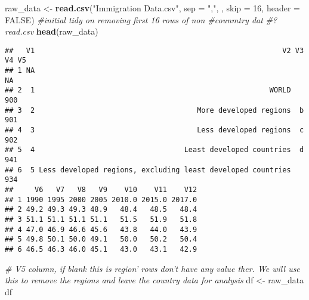 \documentclass[]{article}
\newenvironment{Shaded}{\begin{snugshade}}{\end{snugshade}}
\newcommand{\CommentTok}[1]{\textcolor[rgb]{0.56,0.35,0.01}{\textit{#1}}}
\newcommand{\DataTypeTok}[1]{\textcolor[rgb]{0.13,0.29,0.53}{#1}}
\newcommand{\DecValTok}[1]{\textcolor[rgb]{0.00,0.00,0.81}{#1}}
\newcommand{\KeywordTok}[1]{\textcolor[rgb]{0.13,0.29,0.53}{\textbf{#1}}}
\newcommand{\NormalTok}[1]{#1}
\newcommand{\OtherTok}[1]{\textcolor[rgb]{0.56,0.35,0.01}{#1}}
\newcommand{\StringTok}[1]{\textcolor[rgb]{0.31,0.60,0.02}{#1}}
\begin{document}
\begin{Shaded}
\begin{Highlighting}[]
\NormalTok{raw_data <-}\StringTok{ }\KeywordTok{read.csv}\NormalTok{(}\StringTok{"Immigration Data.csv"}\NormalTok{, }\DataTypeTok{sep =} \StringTok{","}\NormalTok{, , }\DataTypeTok{skip =} \DecValTok{16}\NormalTok{, }\DataTypeTok{header =} \OtherTok{FALSE}\NormalTok{) }\CommentTok{#initial tidy on removing first 16 rows of non #counmtry dat}
\CommentTok{#?read.csv}
\KeywordTok{head}\NormalTok{(raw_data)}
\end{Highlighting}
\end{Shaded}

\begin{verbatim}
##   V1                                                          V2 V3  V4 V5
## 1 NA                                                                 NA   
## 2  1                                                       WORLD    900   
## 3  2                                      More developed regions  b 901   
## 4  3                                      Less developed regions  c 902   
## 5  4                                   Least developed countries  d 941   
## 6  5 Less developed regions, excluding least developed countries    934   
##     V6   V7   V8   V9    V10    V11    V12
## 1 1990 1995 2000 2005 2010.0 2015.0 2017.0
## 2 49.2 49.3 49.3 48.9   48.4   48.5   48.4
## 3 51.1 51.1 51.1 51.1   51.5   51.9   51.8
## 4 47.0 46.9 46.6 45.6   43.8   44.0   43.9
## 5 49.8 50.1 50.0 49.1   50.0   50.2   50.4
## 6 46.5 46.3 46.0 45.1   43.0   43.1   42.9
\end{verbatim}

\begin{Shaded}
\begin{Highlighting}[]
\CommentTok{# V5 column, if blank this is region’ rows don’t have any value ther. We will use this to remove the regions and leave the country data for analysis}
\NormalTok{df <-}\StringTok{ }\NormalTok{raw_data}
\NormalTok{df}
\end{Highlighting}
\end{Shaded}
\end{document}
